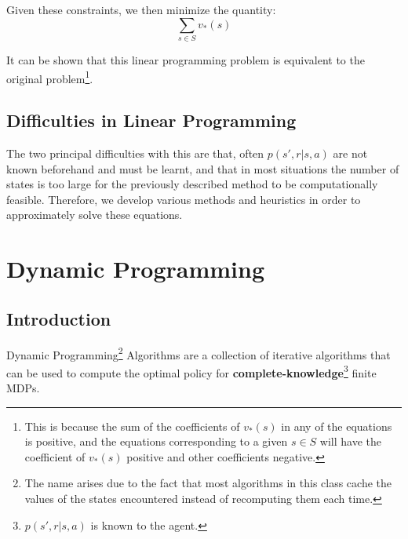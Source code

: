 \documentclass[12pt]{report}
\begin{document}
Given these constraints, we then minimize the quantity:
\begin{equation}
    \sum\limits_{s \in S} v_{*}(s)
\end{equation}

It can be shown that this linear programming problem is equivalent to the original problem\footnote{This is because the sum of the coefficients of $v_{*}(s)$ in any of the equations is positive, and the equations corresponding to a given $s \in S$ will have the coefficient of $v_{*}(s)$ positive and other coefficients negative.}. 


\section{Difficulties in Linear Programming}
The two principal difficulties with this are that, often $p(s', r | s, a)$ are not known beforehand and must be learnt, and that in most situations the number of states is too large for the previously described method to be computationally feasible. Therefore, we develop various methods and 
heuristics in order to approximately solve these equations.

\chapter{Dynamic Programming}
\section{Introduction}
Dynamic Programming\footnote{The name arises due to the fact that most algorithms in this class cache the values of the states encountered instead of recomputing them each time.} Algorithms are a collection of iterative algorithms that can be used to compute the optimal policy for \textbf{complete-knowledge}\footnote{$p(s', r | s, a)$ is known to the agent.} finite MDPs. 
\end{document}
